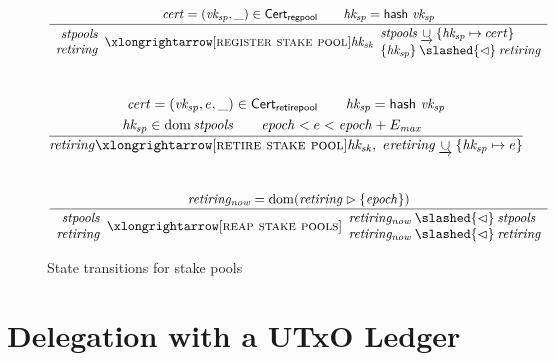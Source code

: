 \documentclass[11pt,a4paper]{article}
\DeclareMathOperator{\dom}{dom}
\newcommand{\restrictdom}{\lhd}
\newcommand{\subtractdom}{\mathbin{\slashed{\restrictdom}}}
\newcommand{\restrictrange}{\rhd}
\newcommand{\unionoverride}{\mathbin{\underrightarrow\cup}}
\newcommand{\var}[1]{\mathit{#1}}
\newcommand{\fun}[1]{\mathsf{#1}}
\newcommand{\type}[1]{\mathsf{#1}}
\newcommand{\transitionarrow}[2]{\xlongrightarrow[\textsc{#1}]{#2}}
\begin{document}
\begin{figure}

\begin{equation*}
\frac{
  \begin{array}{c}
    \var{cert} = (\var{vk_{sp}}, \_) \in \type{Cert_{regpool}} \qquad
    \var{hk_{sp}} = \fun{hash} ~ \var{vk_{sp}}
  \end{array}
}{
  \begin{array}{r}
    \var{stpools} \\
    \var{retiring}
  \end{array}
  \transitionarrow{register stake pool}{\var{hk_{sk}}}
  \begin{array}{l}
    \var{stpools} \unionoverride \{\var{hk_{sp}} \mapsto cert\} \\
    \{\var{hk_{sp}}\} \subtractdom \var{retiring}
  \end{array}
}
\end{equation*}
%
\\[1em]
%
\begin{equation*}
\frac{
  \begin{array}{c}
    \var{cert} = (\var{vk_{sp}}, e, \_) \in \type{Cert_{retirepool}} \qquad
    \var{hk_{sp}} = \fun{hash} ~ \var{vk_{sp}}
    \\[0.3em]
    \var{hk_{sp}} \in \dom \var{stpools} \qquad
    \var{epoch} < e < \var{epoch} + E_\var{max} \qquad
  \end{array}
}{
  \var{retiring}
  \transitionarrow{retire stake pool}{\var{hk_{sk}}, ~ e}
  \var{retiring} \unionoverride \{ \var{hk_{sp}} \mapsto e \}
}
\end{equation*}
%
\\[1em]
%
\begin{equation*}
\frac{
  \var{retiring_{now}} = \dom (\var{retiring} \restrictrange \{\var{epoch}\})
}{
  \begin{array}{r}
    \var{stpools} \\
    \var{retiring}
  \end{array}
  \transitionarrow{reap stake pools}{}
  \begin{array}{l}
    \var{retiring_{now}} \subtractdom \var{stpools} \\
    \var{retiring_{now}} \subtractdom \var{retiring}
  \end{array}
}
\end{equation*}

\caption{State transitions for stake pools}
\label{fig:stake_pool_rules}
\end{figure}

\section{Delegation with a UTxO Ledger}




\end{document}
